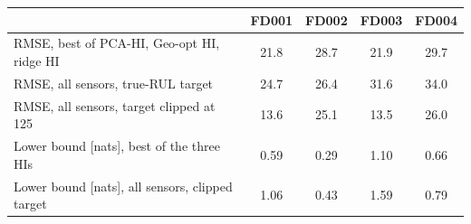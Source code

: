\begin{tabular}{l c c c c}
\hline
 & FD001 & FD002 & FD003 & FD004 \\
\hline
RMSE, best of PCA-HI, Geo-opt HI, ridge HI & 21.8 & 28.7 & 21.9 & 29.7 \\
RMSE, all sensors, true-RUL target & 24.7 & 26.4 & 31.6 & 34.0 \\
RMSE, all sensors, target clipped at 125 & 13.6 & 25.1 & 13.5 & 26.0 \\
Lower bound [nats], best of the three HIs & 0.59 & 0.29 & 1.10 & 0.66 \\
Lower bound [nats], all sensors, clipped target & 1.06 & 0.43 & 1.59 & 0.79 \\
\hline
\end{tabular}
